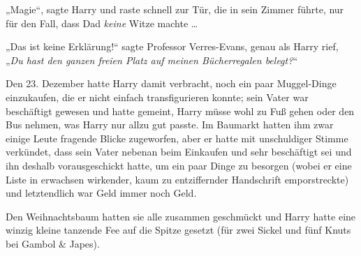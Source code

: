„Magie“, sagte Harry und raste schnell zur Tür, die in sein Zimmer führte, nur für den Fall, dass Dad \emph{keine} Witze machte …

„Das ist keine Erklärung!“ sagte Professor Verres-Evans, genau als Harry rief,
„\emph{Du hast den ganzen freien Platz auf meinen Bücherregalen belegt?}“

\later

Den 23. Dezember hatte Harry damit verbracht, noch ein paar Muggel-Dinge einzukaufen, die er nicht einfach transfigurieren konnte; sein Vater war beschäftigt gewesen und hatte gemeint, Harry müsse wohl zu Fuß gehen oder den Bus nehmen, was Harry nur allzu gut passte. Im Baumarkt hatten ihm zwar einige Leute fragende Blicke zugeworfen, aber er hatte mit unschuldiger Stimme verkündet, dass sein Vater nebenan beim Einkaufen und sehr beschäftigt sei und ihn deshalb vorausgeschickt hatte, um ein paar Dinge zu besorgen (wobei er eine Liste in erwachsen wirkender, kaum zu entziffernder Handschrift emporstreckte) und letztendlich war Geld immer noch Geld.

Den Weihnachtsbaum hatten sie alle zusammen geschmückt und Harry hatte eine winzig kleine tanzende Fee auf die Spitze gesetzt (für zwei Sickel und fünf Knuts bei Gambol \& Japes).

